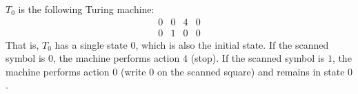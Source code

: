 $T_0$ is the following Turing machine:
\[
\begin{array}{cccc}
0 & 0 & 4 & 0 \\
0 & 1 & 0 & 0
\end{array}
\]
That is, $T_0$ has a single state $0$, which is also the initial state. If the scanned symbol is $0$, the machine performs action $4$ (stop). If the scanned symbol is $1$, the machine performs action $0$ (write $0$ on the scanned square) and remains in state $0$.
